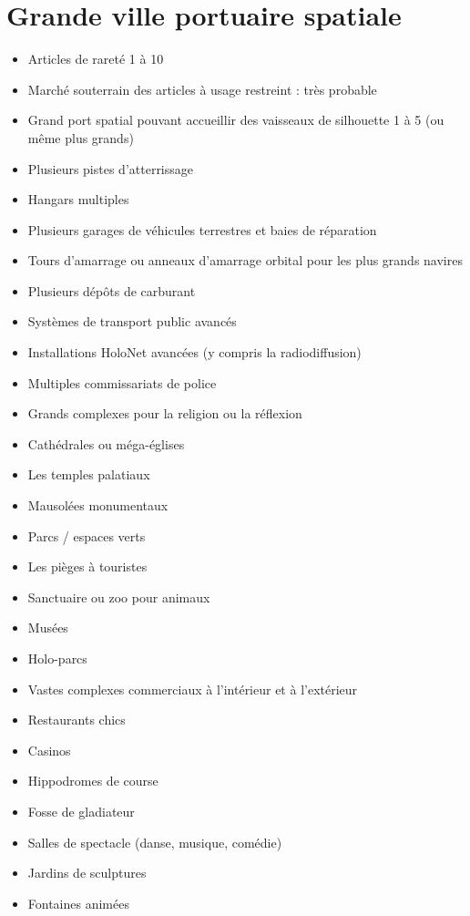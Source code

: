 \documentclass{article}
\begin{document}
\section*{Grande ville portuaire spatiale}
\begin{multicols}{2}
	\begin{itemize}
		\item Articles de rareté 1 à 10
		\item Marché souterrain des articles à usage restreint : très probable
		\item Grand port spatial pouvant accueillir des vaisseaux de silhouette 1 à 5 (ou même plus grands)
		\item Plusieurs pistes d'atterrissage
		\item Hangars multiples
		\item Plusieurs garages de véhicules terrestres et baies de réparation
		\item Tours d'amarrage ou anneaux d'amarrage orbital pour les plus grands navires
		\item Plusieurs dépôts de carburant
		\item Systèmes de transport public avancés
		\item Installations HoloNet avancées (y compris la radiodiffusion)
		\item Multiples commissariats de police
		\item Grands complexes pour la religion ou la réflexion
		\item Cathédrales ou méga-églises
		\item Les temples palatiaux
		\item Mausolées monumentaux
		\item Parcs / espaces verts
		\item Les pièges à touristes
		\item Sanctuaire ou zoo pour animaux
		\item Musées
		\item Holo-parcs
		\item Vastes complexes commerciaux à l'intérieur et à l'extérieur
		\item Restaurants chics
		\item Casinos
		\item Hippodromes de course
		\item Fosse de gladiateur
		\item Salles de spectacle (danse, musique, comédie)
		\item Jardins de sculptures
		\item Fontaines animées

\end{itemize}
\end{multicols}
\end{document}

